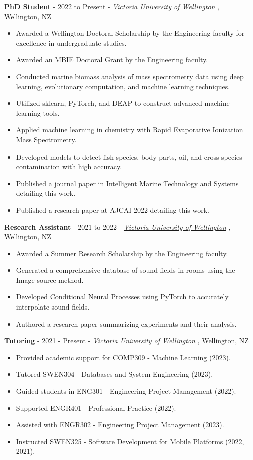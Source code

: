 \documentclass[9pt]{developercv}
\begin{document}
 \textbf{PhD Student} - 2022 to Present - \emph{\href{https://www.wgtn.ac.nz/}{Victoria University of Wellington}} , Wellington, NZ
\begin{itemize}
    \item Awarded a Wellington Doctoral Scholarship by the Engineering faculty for excellence in undergraduate studies.
    \item Awarded an MBIE Doctoral Grant by the Engineering faculty.
    \item Conducted marine biomass analysis of mass spectrometry data using deep learning, evolutionary computation, and machine learning techniques.
    \item Utilized sklearn, PyTorch, and DEAP to construct advanced machine learning tools.
    \item Applied machine learning in chemistry with Rapid Evaporative Ionization Mass Spectrometry.
    \item Developed models to detect fish species, body parts, oil, and cross-species contamination with high accuracy.
    \item Published a journal paper in Intelligent Marine Technology and Systems detailing this work.
    \item Published a research paper at AJCAI 2022 detailing this work.
\end{itemize}

\textbf{Research Assistant} - 2021 to 2022 - \emph{\href{https://www.wgtn.ac.nz/}{Victoria University of Wellington}} , Wellington, NZ
\begin{itemize}
    \item Awarded a Summer Research Scholarship by the Engineering faculty.
    \item Generated a comprehensive database of sound fields in rooms using the Image-source method.
    \item Developed Conditional Neural Processes using PyTorch to accurately interpolate sound fields.
    \item Authored a research paper summarizing experiments and their analysis.
\end{itemize}

\textbf{Tutoring} - 2021 - Present - \emph{\href{https://www.wgtn.ac.nz/}{Victoria University of Wellington}} , Wellington, NZ
\begin{itemize}
    \item Provided academic support for COMP309 - Machine Learning (2023).
    \item Tutored SWEN304 - Databases and System Engineering (2023).
    \item Guided students in ENG301 - Engineering Project Management (2022).
    \item Supported ENGR401 - Professional Practice (2022).
    \item Assisted with ENGR302 - Engineering Project Management (2023).
    \item Instructed SWEN325 - Software Development for Mobile Platforms (2022, 2021).
\end{itemize}
\end{document}
